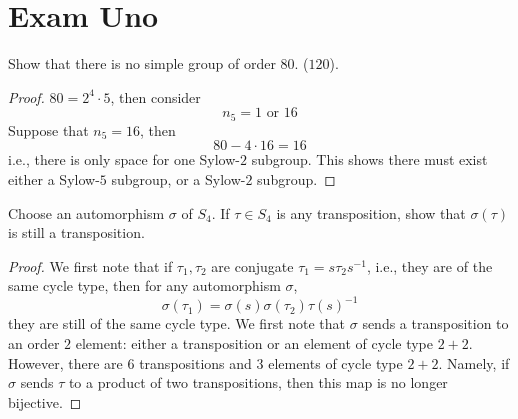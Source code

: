 \documentclass[openany]{book}
\newcommand{\tr}{\text{tr}}
\begin{document}



\chapter{Exam Uno}
\begin{prob}
    Show that there is no simple group of order $80$. ($120$).
\end{prob}
\begin{proof}
    $80=2^4\cdot 5$, then consider 
    \begin{equation*}
        n_5=1 \text{ or } 16
    \end{equation*}
    Suppose that $n_5=16$, then 
    \begin{equation*}
        80-4\cdot 16=16
    \end{equation*}
    i.e., there is only space for one Sylow-$2$ subgroup. This shows there must exist either a Sylow-$5$ subgroup, or a Sylow-$2$ subgroup.
\end{proof}

\begin{prob}
    Choose an automorphism $\sigma$ of $S_4$. If $\tau\in S_4$ is any transposition, show that $\sigma(\tau)$ is still a transposition.
\end{prob}
\begin{proof}
    We first note that if $\tau_1,\tau_2$ are conjugate $\tau_1=s\tau_2s^{-1}$, i.e., they are of the same cycle type, then for any automorphism $\sigma$, 
    \begin{equation*}
        \sigma(\tau_1)=\sigma(s)\sigma(\tau_2)\tau(s)^{-1}
    \end{equation*}
    they are still of the same cycle type. We first note that $\sigma$ sends a transposition to an order $2$ element: either a transposition or an element of cycle type $2+2$. However, there are $6$ transpositions and $3$ elements of cycle type $2+2$. Namely, if $\sigma$ sends $\tau$ to a product of two transpositions, then this map is no longer bijective.
\end{proof}
\end{document}
